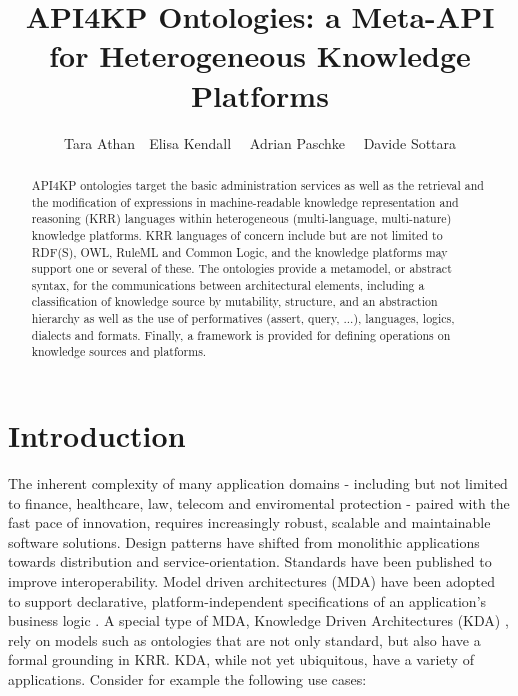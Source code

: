 \documentclass[runningheads]{llncs}
\title{API4KP Ontologies: a Meta-API for Heterogeneous Knowledge Platforms}
\date{}
\begin{document}
%
\author{Tara Athan\ \ Elisa Kendall \ \ Adrian Paschke \ \ Davide Sottara}

%
\maketitle

\begin{abstract}
API4KP ontologies target the basic administration
services as well as the retrieval and the modification of expressions in machine-readable knowledge representation and reasoning (KRR) languages within heterogeneous (multi-language, multi-nature) knowledge platforms.
KRR languages of concern include but are not limited to RDF(S), OWL, RuleML and Common Logic, and the knowledge platforms may support one or several of these.
The ontologies provide a metamodel, or abstract syntax, for the communications between architectural elements, including a classification of knowledge source by mutability, structure, and an abstraction hierarchy as well as the use of performatives (assert, query, ...), languages, logics, dialects and formats. Finally, a framework is provided for defining operations on knowledge sources and platforms.
\end{abstract}

%

\section{Introduction}
The inherent complexity of many application domains \-- including but not limited to finance, healthcare, law, telecom and enviromental protection \-- paired with the fast pace of innovation, requires increasingly robust, scalable and maintainable software solutions. Design patterns have shifted from monolithic applications towards distribution and service-orientation. Standards have been published to improve interoperability. Model driven architectures (MDA) have been adopted to support declarative, platform-independent specifications of an application's business logic \cite{Mellor et al:2004}. A special type of MDA, Knowledge Driven Architectures (KDA) \cite{Rector:2010}, rely on models such as ontologies that are not only standard, but also have a formal grounding in KRR. 
KDA, while not yet ubiquitous, have a variety of applications. Consider for example the following use cases:
\end{document}
